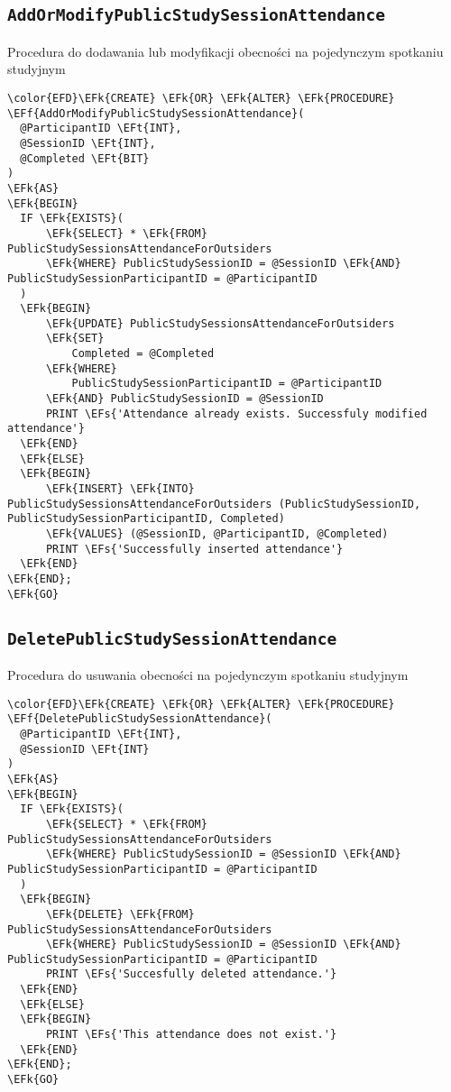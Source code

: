 \documentclass[11pt]{article}
\newcommand{\EFs}[1]{\textcolor{EFs}{#1}} %
\newcommand{\EFk}[1]{\textcolor{EFk}{\textbf{#1}}} %
\newcommand{\EFf}[1]{\textcolor{EFf}{#1}} %
\newcommand{\EFt}[1]{\textcolor{EFt}{\textbf{#1}}} %
\begin{document}
\subsection{\texttt{AddOrModifyPublicStudySessionAttendance}}
\label{sec:orga341dd2}
Procedura do dodawania lub modyfikacji obecności na pojedynczym spotkaniu studyjnym
\begin{Code}
\begin{Verbatim}
\color{EFD}\EFk{CREATE} \EFk{OR} \EFk{ALTER} \EFk{PROCEDURE} \EFf{AddOrModifyPublicStudySessionAttendance}(
  @ParticipantID \EFt{INT},
  @SessionID \EFt{INT},
  @Completed \EFt{BIT}
)
\EFk{AS}
\EFk{BEGIN}
  IF \EFk{EXISTS}(
      \EFk{SELECT} * \EFk{FROM} PublicStudySessionsAttendanceForOutsiders
      \EFk{WHERE} PublicStudySessionID = @SessionID \EFk{AND} PublicStudySessionParticipantID = @ParticipantID
  )
  \EFk{BEGIN}
      \EFk{UPDATE} PublicStudySessionsAttendanceForOutsiders
      \EFk{SET}
          Completed = @Completed
      \EFk{WHERE}
          PublicStudySessionParticipantID = @ParticipantID
      \EFk{AND} PublicStudySessionID = @SessionID
      PRINT \EFs{'Attendance already exists. Successfuly modified attendance'}
  \EFk{END}
  \EFk{ELSE}
  \EFk{BEGIN}
      \EFk{INSERT} \EFk{INTO} PublicStudySessionsAttendanceForOutsiders (PublicStudySessionID, PublicStudySessionParticipantID, Completed)
      \EFk{VALUES} (@SessionID, @ParticipantID, @Completed)
      PRINT \EFs{'Successfully inserted attendance'}
  \EFk{END}
\EFk{END};
\EFk{GO}
\end{Verbatim}
\end{Code}
\subsection{\texttt{DeletePublicStudySessionAttendance}}
\label{sec:org35c10b0}
Procedura do usuwania obecności na pojedynczym spotkaniu studyjnym
\begin{Code}
\begin{Verbatim}
\color{EFD}\EFk{CREATE} \EFk{OR} \EFk{ALTER} \EFk{PROCEDURE} \EFf{DeletePublicStudySessionAttendance}(
  @ParticipantID \EFt{INT},
  @SessionID \EFt{INT}
)
\EFk{AS}
\EFk{BEGIN}
  IF \EFk{EXISTS}(
      \EFk{SELECT} * \EFk{FROM} PublicStudySessionsAttendanceForOutsiders
      \EFk{WHERE} PublicStudySessionID = @SessionID \EFk{AND} PublicStudySessionParticipantID = @ParticipantID
  )
  \EFk{BEGIN}
      \EFk{DELETE} \EFk{FROM} PublicStudySessionsAttendanceForOutsiders
      \EFk{WHERE} PublicStudySessionID = @SessionID \EFk{AND} PublicStudySessionParticipantID = @ParticipantID
      PRINT \EFs{'Succesfully deleted attendance.'}
  \EFk{END}
  \EFk{ELSE}
  \EFk{BEGIN}
      PRINT \EFs{'This attendance does not exist.'}
  \EFk{END}
\EFk{END};
\EFk{GO}
\end{Verbatim}
\end{Code}
\end{document}
